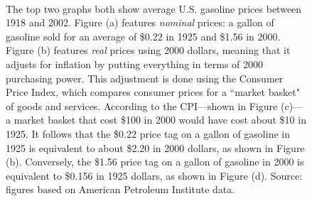 \documentclass{article}
\begin{document}
        
\begin{figure}%
\centering
    \hspace{2cm}
    \\[2\baselineskip]
        \hspace{3mm}
    \hspace{2cm}
\caption{The top two graphs both show average U.S. gasoline prices between 1918 and 2002. Figure (a) features \emph{nominal} prices: a gallon of gasoline sold for an average of \$0.22 in 1925 and \$1.56 in 2000. Figure (b) features \emph{real} prices using 2000 dollars, meaning that it adjusts for inflation by putting everything in terms of 2000 purchasing power. This adjustment is done using the Consumer Price Index, which compares consumer prices for a ``market basket" of goods and services. According to the CPI---shown in Figure (c)---a market basket that cost \$100 in 2000 would have cost about \$10 in 1925. It follows that the \$0.22 price tag on a gallon of gasoline in 1925 is equivalent to about \$2.20 in 2000 dollars, as shown in Figure (b). Conversely, the \$1.56 price tag on a gallon of gasoline in 2000 is equivalent to \$0.156 in 1925 dollars, as shown in Figure (d). Source: figures based on American Petroleum Institute data.}
\label{supplydemandshifts}
\end{figure}
\end{document}
